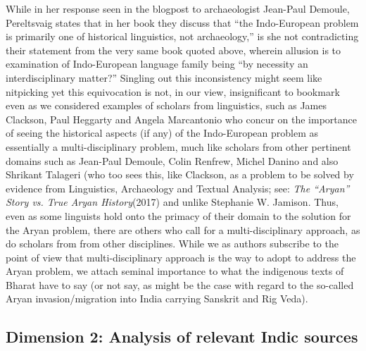 While in her response seen in the blogpost to archaeologist Jean-Paul Demoule, Pereltsvaig states that in her book they discuss that “the Indo-European problem is primarily one of historical linguistics, not archaeology,” is she not contradicting their statement from the very same book quoted above, wherein allusion is to examination of Indo-European language family being “by necessity an interdisciplinary matter?” Singling out this inconsistency might seem like nitpicking yet this equivocation is not, in our view, insignificant to bookmark even as we considered examples of scholars from linguistics, such as James Clackson, Paul Heggarty and Angela Marcantonio who concur on the importance of seeing the historical aspects (if any) of the Indo-European problem as essentially a multi-disciplinary problem, much like scholars from other pertinent domains such as Jean-Paul Demoule, Colin Renfrew, Michel Danino and also Shrikant Talageri (who too sees this, like Clackson, as a problem to be solved by evidence from Linguistics, Archaeology and Textual Analysis; see: \textit{The “Aryan” Story vs. True Aryan History}(2017) and unlike Stephanie W. Jamison. Thus, even as some linguists hold onto the primacy of their domain to the solution for the Aryan problem, there are others who call for a multi-disciplinary approach, as do scholars from from other disciplines. While we as authors subscribe to the point of view that multi-disciplinary approach is the way to adopt to address the Aryan problem, we attach seminal importance to what the indigenous texts of Bharat have to say (or not say, as might be the case with regard to the so-called Aryan invasion/migration into India carrying Sanskrit and Rig Veda).


\subsection{Dimension 2: Analysis of relevant Indic sources}

